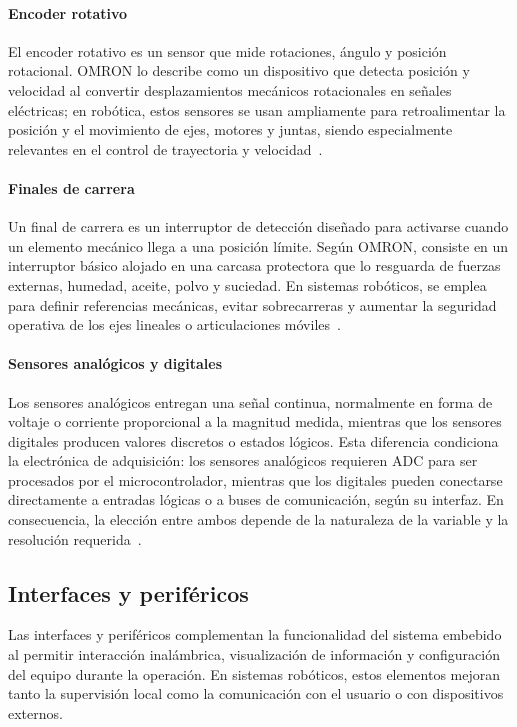 \paragraph{Encoder rotativo} El encoder rotativo es un sensor que mide rotaciones, ángulo y posición rotacional. OMRON lo describe como un dispositivo que detecta posición y velocidad al convertir desplazamientos mecánicos rotacionales en señales eléctricas; en robótica, estos sensores se usan ampliamente para retroalimentar la posición y el movimiento de ejes, motores y juntas, siendo especialmente relevantes en el control de trayectoria y velocidad~\cite{omronEncoder}.

\paragraph{Finales de carrera} Un final de carrera es un interruptor de detección diseñado para activarse cuando un elemento mecánico llega a una posición límite. Según OMRON, consiste en un interruptor básico alojado en una carcasa protectora que lo resguarda de fuerzas externas, humedad, aceite, polvo y suciedad. En sistemas robóticos, se emplea para definir referencias mecánicas, evitar sobrecarreras y aumentar la seguridad operativa de los ejes lineales o articulaciones móviles~\cite{omronLimitSwitch}.

\paragraph{Sensores analógicos y digitales} Los sensores analógicos entregan una señal continua, normalmente en forma de voltaje o corriente proporcional a la magnitud medida, mientras que los sensores digitales producen valores discretos o estados lógicos. Esta diferencia condiciona la electrónica de adquisición: los sensores analógicos requieren ADC para ser procesados por el microcontrolador, mientras que los digitales pueden conectarse directamente a entradas lógicas o a buses de comunicación, según su interfaz. En consecuencia, la elección entre ambos depende de la naturaleza de la variable y la resolución requerida~\cite{stm2018adc,nxp2021i2c}.

\subsection{Interfaces y periféricos}
Las interfaces y periféricos complementan la funcionalidad del sistema embebido al permitir interacción inalámbrica, visualización de información y configuración del equipo durante la operación. En sistemas robóticos, estos elementos mejoran tanto la supervisión local como la comunicación con el usuario o con dispositivos externos.

